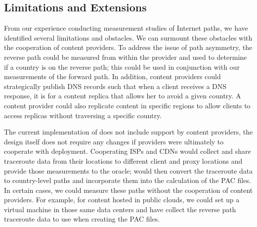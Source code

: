 \subsection{Limitations and Extensions}

From our experience conducting measurement studies of Internet paths, we have
identified several limitations and obstacles. We can surmount these obstacles with the cooperation of content providers. To
address the issue of path asymmetry, the reverse path could be measured from
within the provider and used to determine if a country is on the reverse path;
this could be used in conjunction with our measurements  of the forward path.
In addition, content providers could strategically publish DNS records such
that when a client receives a DNS response, it is for a content replica that
allows her to avoid a given country.  A content provider could also  replicate
content in specific regions to allow clients to access replicas without
traversing a specific  country.


The current implementation of \system{} does not include support by content
providers, the design itself does not require any changes if providers were
ultimately to cooperate with deployment. Cooperating ISPs and CDNs would
collect and share traceroute data from their locations to different client and
proxy locations and provide those measurements to the \system{} oracle;
\system{} would then convert the traceroute data to country-level paths and
incorporate them into the calculation of the  PAC files.  In certain cases, we
could measure these paths without the cooperation of content providers. For
example, for content hosted in public clouds, we could set up a virtual
machine in those same data centers and have  \system{} collect the reverse
path traceroute data to use when creating the PAC files.


%
